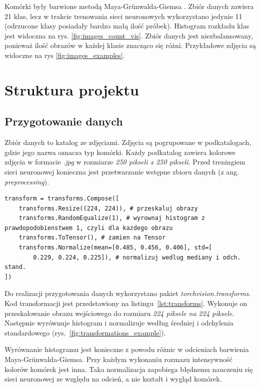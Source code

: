 Komórki były barwione metodą Maya-Grünwalda-Giemsa \cite{histology}.
Zbiór danych zawiera 21 klas, lecz w trakcie trenowania sieci neuronowych wykorzystano jedynie 11 (odrzucone klasy posiadały bardzo małą ilość próbek).
Histogram rozkładu klas jest widoczna na rys. \ref{fig:images_count_vis}.
Zbiór danych jest niezbalansowany, ponieważ ilość obrazów w każdej klasie znacząco się różni.
Przykładowe zdjęcia są widoczne na rys \ref{fig:images_examples}.


\section{Struktura projektu}

\subsection{Przygotowanie danych}

Zbiór danych to katalog ze zdjęciami.
Zdjęcia są pogrupowane w podkatalogach, gdzie jego nazwa oznacza typ komórki.
Każdy podkatalog zawiera kolorowe zdjęcia w formacie \textit{.jpg} w rozmiarze \textit{250 pikseli x 250 pikseli}.
Przed treningiem sieci neuronowej konieczna jest przetwarzanie wstępne zbioru danych (z ang. \textit{preprocessing}).

\begin{lstlisting}[language=ipython,caption={Transformacja danych}, label={lst:transforms}]
transform = transforms.Compose([
    transforms.Resize((224, 224)), # przeskaluj obrazy
    transforms.RandomEqualize(1), # wyrownaj histogram z prawdopodobienstwem 1, czyli dla kazdego obrazu
    transforms.ToTensor(), # zamien na Tensor
    transforms.Normalize(mean=[0.485, 0.456, 0.406], std=[
        0.229, 0.224, 0.225]), # normalizuj wedlug mediany i odch. stand.
])
\end{lstlisting}

Do realizacji przygotowania danych wykorzystano pakiet \textit{torchvision.transforms}.
Kod transformacji jest przedstawiony na listingu~\ref{lst:transforms}.
Wykonuje on przeskalowanie obrazu wejściowego do rozmiaru \textit{224 piksele na 224 piksele}.
Następnie wyrównuje histogram i normalizuje według średniej i odchylenia standardowego (rys.~\ref{fig:transformations_example}).

Wyrównanie histogramu jest konieczne z powodu różnic w odcieniach barwienia Maya-Grünwalda-Giemsa.
Przy każdym wykonaniu rozmazu intensywność kolorów komórek jest inna.
Taka normalizacja zapobiega błędnemu nauczeniu się sieci neuronowej ze względu na odcień, a nie kształt i wygląd komórek.

